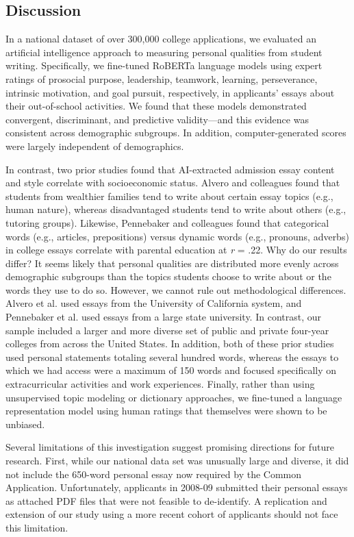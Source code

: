 \documentclass[11pt]{report}
\begin{document}
\begin{mainf}
\section{Discussion}
In a national dataset of over 300,000 college applications, we evaluated an artificial intelligence approach to measuring personal qualities from student writing. Specifically, we fine-tuned RoBERTa language models using expert ratings of prosocial purpose, leadership, teamwork, learning, perseverance, intrinsic motivation, and goal pursuit, respectively, in applicants’ essays about their out-of-school activities. We found that these models demonstrated convergent, discriminant, and predictive validity---and this evidence was consistent across demographic subgroups. In addition, computer-generated scores were largely independent of demographics. 

In contrast, two prior studies found that AI-extracted admission essay content and style correlate with socioeconomic status. Alvero and colleagues \cite{alvero_essay_2021} found that students from wealthier families tend to write about certain essay topics (e.g., human nature), whereas disadvantaged students tend to write about others (e.g., tutoring groups).
Likewise, Pennebaker and colleagues \cite{pennebaker_when_2014} found that categorical words (e.g., articles, prepositions) versus dynamic words (e.g., pronouns, adverbs) in college essays correlate with parental education at \textit{r} = .22.
Why do our results differ? It seems likely that personal qualities are distributed more evenly across demographic subgroups than the topics students choose to write about or the words they use to do so. However, we cannot rule out methodological differences. Alvero et al. \cite{alvero_essay_2021} used essays from the University of California system, and Pennebaker et al. \cite{pennebaker_when_2014} used essays from a large state university. 
In contrast, our sample included a larger and more diverse set of public and private four-year colleges from across the United States. In addition, both of these prior studies used personal statements totaling several hundred words, whereas the essays to which we had access were a maximum of 150 words and focused specifically on extracurricular activities and work experiences. Finally, rather than using unsupervised topic modeling or dictionary approaches, we fine-tuned a language representation model using human ratings that themselves were shown to be unbiased.

Several limitations of this investigation suggest promising directions for future research. First, while our national data set was unusually large and diverse, it did not include the 650-word personal essay now required by the Common Application. Unfortunately, applicants in 2008-09 submitted their personal essays as attached PDF files that were not feasible to de-identify. A replication and extension of our study using a more recent cohort of applicants should not face this limitation. 


\end{mainf}
\end{document}
